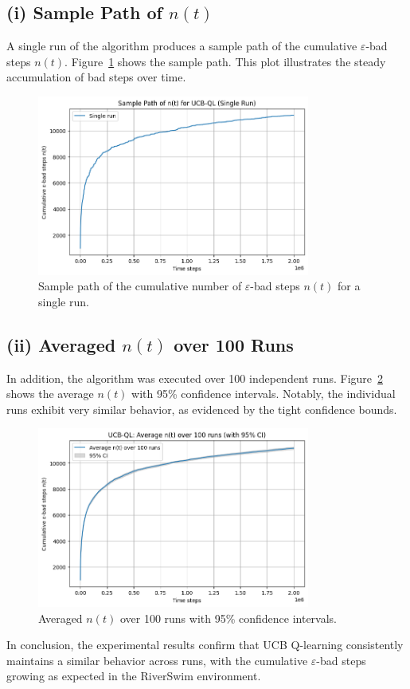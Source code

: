 \subsection*{(i) Sample Path of $n(t)$}
A single run of the algorithm produces a sample path of the cumulative $\varepsilon$-bad steps $n(t)$. Figure~\ref{fig:sample_path} shows the sample path. This plot illustrates the steady accumulation of bad steps over time.

\begin{figure}[H]
  \centering
  \includegraphics[width=0.8\textwidth]{Code/sample_path_ucbql.png} %
  \caption{Sample path of the cumulative number of $\varepsilon$-bad steps $n(t)$ for a single run.}
  \label{fig:sample_path}
\end{figure}

\subsection*{(ii) Averaged $n(t)$ over 100 Runs}
In addition, the algorithm was executed over 100 independent runs. Figure~\ref{fig:avg_nt} shows the average $n(t)$ with 95\% confidence intervals. Notably, the individual runs exhibit very similar behavior, as evidenced by the tight confidence bounds.

\begin{figure}[H]
  \centering
  \includegraphics[width=0.8\textwidth]{Code/average_n_t_ucbql.png} %
  \caption{Averaged $n(t)$ over 100 runs with 95\% confidence intervals.}
  \label{fig:avg_nt}
\end{figure}

In conclusion, the experimental results confirm that UCB Q-learning consistently maintains a similar behavior across runs, with the cumulative $\varepsilon$-bad steps growing as expected in the RiverSwim environment.